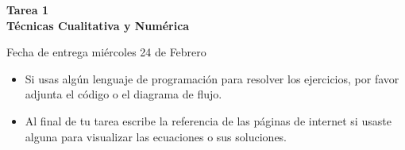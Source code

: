 \documentclass[12pt]{exam}
\begin{document}
\centering


\Large 
\textbf{\huge Tarea 1\\ \large Técnicas Cualitativa y Numérica}

\small
Fecha de entrega miércoles 24 de Febrero
\vskip10pt

\normalsize
\begin{tcolorbox}
\begin{itemize}
    \item Si usas algún lenguaje de programación para resolver los ejercicios, por favor adjunta el código o el diagrama de flujo.
    \item Al final de tu tarea escribe la referencia de las páginas de internet si usaste alguna para visualizar las ecuaciones o sus soluciones.
\end{itemize}


\end{tcolorbox}
\pointformat{\bfseries\boldmath(\thepoints)}
\end{document}
